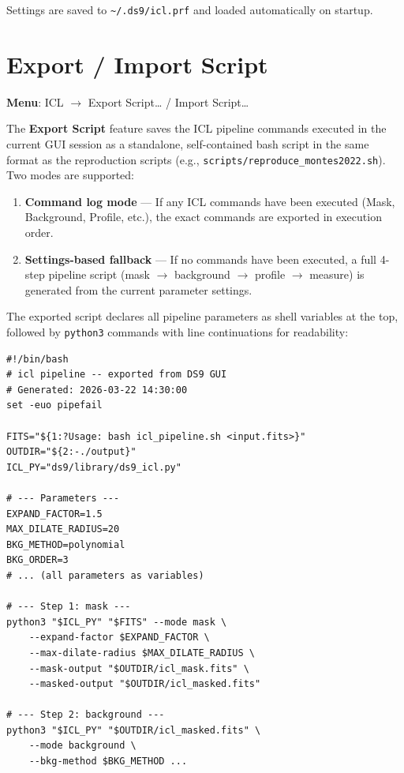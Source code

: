 \documentclass[11pt,fleqn]{book}
\begin{document}
Settings are saved to \texttt{\textasciitilde/.ds9/icl.prf} and loaded automatically on startup.


\section{Export / Import Script}
\label{sec:icl-export-import}

\textbf{Menu}: ICL $\to$ Export Script\ldots{} / Import Script\ldots

The \textbf{Export Script} feature saves the ICL pipeline commands executed in the current GUI session as a standalone, self-contained bash script in the same format as the reproduction scripts (e.g., \texttt{scripts/reproduce\_montes2022.sh}).  Two modes are supported:

\begin{enumerate}
  \item \textbf{Command log mode} --- If any ICL commands have been executed (Mask, Background, Profile, etc.), the exact commands are exported in execution order.
  \item \textbf{Settings-based fallback} --- If no commands have been executed, a full 4-step pipeline script (mask $\to$ background $\to$ profile $\to$ measure) is generated from the current parameter settings.
\end{enumerate}

\noindent The exported script declares all pipeline parameters as shell variables at the top, followed by \texttt{python3} commands with line continuations for readability:

\begin{codebox}
\begin{lstlisting}[style=bash,numbers=none]
#!/bin/bash
# icl pipeline -- exported from DS9 GUI
# Generated: 2026-03-22 14:30:00
set -euo pipefail

FITS="${1:?Usage: bash icl_pipeline.sh <input.fits>}"
OUTDIR="${2:-./output}"
ICL_PY="ds9/library/ds9_icl.py"

# --- Parameters ---
EXPAND_FACTOR=1.5
MAX_DILATE_RADIUS=20
BKG_METHOD=polynomial
BKG_ORDER=3
# ... (all parameters as variables)

# --- Step 1: mask ---
python3 "$ICL_PY" "$FITS" --mode mask \
    --expand-factor $EXPAND_FACTOR \
    --max-dilate-radius $MAX_DILATE_RADIUS \
    --mask-output "$OUTDIR/icl_mask.fits" \
    --masked-output "$OUTDIR/icl_masked.fits"

# --- Step 2: background ---
python3 "$ICL_PY" "$OUTDIR/icl_masked.fits" \
    --mode background \
    --bkg-method $BKG_METHOD ...
\end{lstlisting}
\end{codebox}
\end{document}
